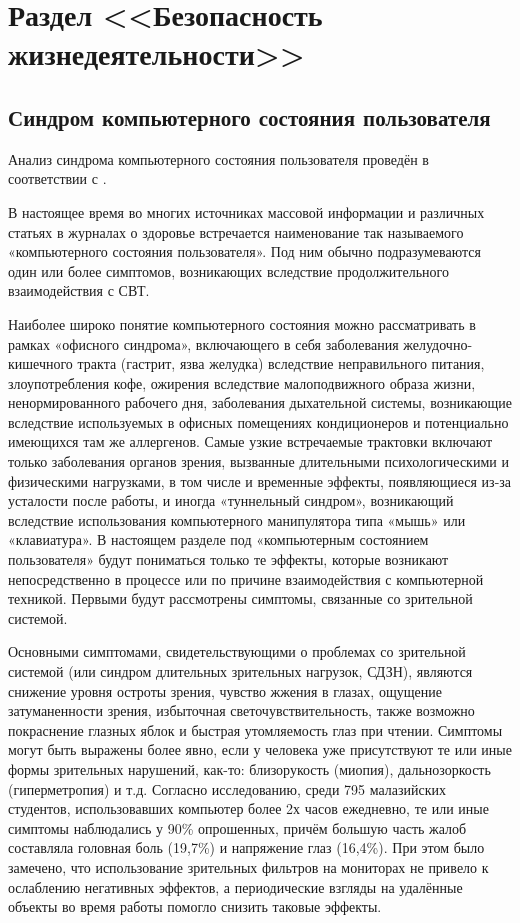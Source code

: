 \section {Раздел <<Безопасность жизнедеятельности>>}
\subsection {Синдром компьютерного состояния пользователя}
Анализ синдрома компьютерного состояния пользователя проведён в соответствии с \cite{OFFICESYNDROME, COMPUTERVISION, WRISTPOSTURE, CARPALTUNNEL, SANPIN}.

В настоящее время во многих источниках массовой информации и различных статьях в журналах о здоровье встречается наименование так называемого «компьютерного состояния пользователя». Под ним обычно подразумеваются один или более симптомов, возникающих вследствие продолжительного взаимодействия с СВТ. 

Наиболее широко понятие компьютерного состояния можно рассматривать в рамках «офисного синдрома», включающего в себя заболевания желудочно-кишечного тракта  (гастрит, язва желудка) вследствие неправильного питания, злоупотребления кофе, ожирения вследствие малоподвижного образа жизни, ненормированного рабочего дня, заболевания дыхательной системы, возникающие вследствие используемых в офисных помещениях кондиционеров и потенциально имеющихся там же аллергенов\cite{OFFICESYNDROME}. Самые узкие встречаемые трактовки включают только заболевания органов зрения, вызванные длительными психологическими и физическими нагрузками, в том числе и временные эффекты, появляющиеся из-за усталости после работы, и иногда «туннельный синдром», возникающий вследствие использования компьютерного манипулятора типа «мышь» или «клавиатура». В настоящем разделе под «компьютерным состоянием пользователя» будут пониматься только те эффекты, которые возникают непосредственно в процессе или по причине взаимодействия с компьютерной техникой. Первыми будут рассмотрены симптомы, связанные со зрительной системой.

Основными симптомами, свидетельствующими о проблемах со зрительной системой (или синдром длительных зрительных нагрузок, СДЗН), являются снижение уровня остроты зрения, чувство жжения в глазах, ощущение затуманенности зрения, избыточная светочувствительность, также возможно покраснение глазных яблок и быстрая утомляемость глаз при чтении. Симптомы могут быть выражены более явно, если у человека уже присутствуют те или иные формы зрительных нарушений, как-то: близорукость (миопия), дальнозоркость (гиперметропия) и т.д. Согласно исследованию, среди 795 малазийских студентов, использовавших компьютер более 2х часов ежедневно, те или иные симптомы наблюдались у 90\% опрошенных, причём большую часть жалоб составляла головная боль (19,7\%) и напряжение глаз (16,4\%)\cite{COMPUTERVISION}. При  этом было замечено, что использование зрительных фильтров на мониторах не привело к ослаблению негативных эффектов, а периодические взгляды на удалённые объекты во время работы помогло снизить таковые эффекты. 

